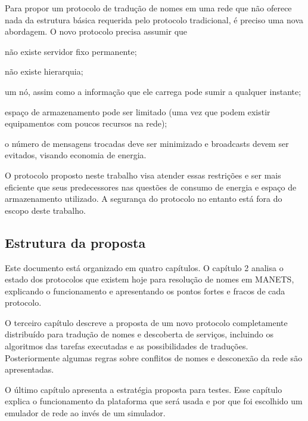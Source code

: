 Para propor um protocolo de tradução de nomes em uma rede que não oferece nada
da estrutura básica requerida pelo protocolo tradicional, é preciso uma nova
abordagem. O novo protocolo precisa assumir que
\begin{inparaenum}[(i)]
    \item não existe servidor fixo permanente;
    \item não existe hierarquia;
    \item um nó, assim como a informação que ele carrega pode sumir a qualquer
    instante;
    \item espaço de armazenamento pode ser limitado (uma vez que podem existir
    equipamentos com poucos recursos na rede);
    \item o número de mensagens trocadas deve ser minimizado e broadcasts devem
    ser evitados, visando economia de energia.
\end{inparaenum}

O protocolo proposto neste trabalho visa atender essas restrições e ser mais
eficiente que seus predecessores \cite{mcdns} \cite{dnssd} \cite{mdns} nas questões
de consumo de energia e espaço de armazenamento utilizado. A segurança do protocolo
no entanto está fora do escopo deste trabalho.

\subsection{Estrutura da proposta}

Este documento está organizado em quatro capítulos. O capítulo 2 analisa o estado
dos protocolos que existem hoje para resolução de nomes em MANETS, explicando o
funcionamento e apresentando os pontos fortes e fracos de cada protocolo.

O terceiro capítulo descreve a proposta de um novo protocolo completamente
distribuído para tradução de nomes e descoberta de serviços, incluindo os
algoritmos das tarefas executadas e as possibilidades de traduções. Posteriormente
algumas regras sobre conflitos de nomes e desconexão da rede são apresentadas.

O último capítulo apresenta a estratégia proposta para testes. Esse capítulo
explica o funcionamento da plataforma que será usada e por que foi escolhido um
emulador de rede ao invés de um simulador.